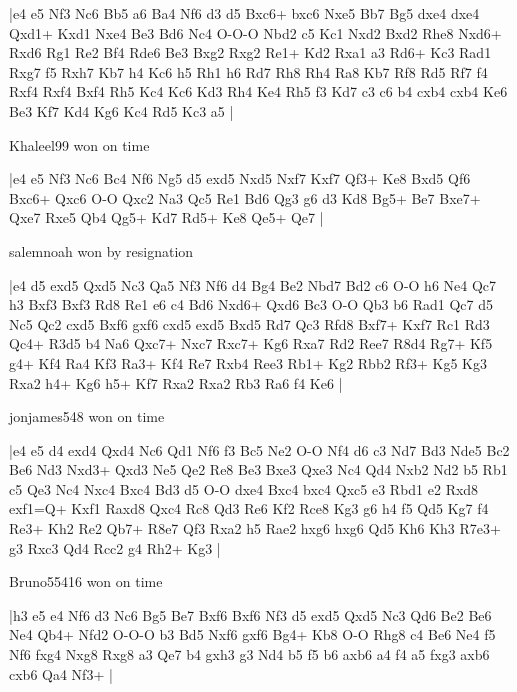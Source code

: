 \makegametitle
|e4 e5 Nf3 Nc6 Bb5 a6 Ba4 Nf6 d3 d5 Bxc6+ bxc6 Nxe5 Bb7 Bg5 dxe4 dxe4 Qxd1+ Kxd1 Nxe4 Be3 Bd6 Nc4 O-O-O Nbd2 c5 Kc1 Nxd2 Bxd2 Rhe8 Nxd6+ Rxd6 Rg1 Re2 Bf4 Rde6 Be3 Bxg2 Rxg2 Re1+ Kd2 Rxa1 a3 Rd6+ Kc3 Rad1 Rxg7 f5 Rxh7 Kb7 h4 Kc6 h5 Rh1 h6 Rd7 Rh8 Rh4 Ra8 Kb7 Rf8 Rd5 Rf7 f4 Rxf4 Rxf4 Bxf4 Rh5 Kc4 Kc6 Kd3 Rh4 Ke4 Rh5 f3 Kd7 c3 c6 b4 cxb4 cxb4 Ke6 Be3 Kf7 Kd4 Kg6 Kc4 Rd5 Kc3 a5  |

\showboard

Khaleel99 won on time

\makegametitle
|e4 e5 Nf3 Nc6 Bc4 Nf6 Ng5 d5 exd5 Nxd5 Nxf7 Kxf7 Qf3+ Ke8 Bxd5 Qf6 Bxc6+ Qxc6 O-O Qxc2 Na3 Qc5 Re1 Bd6 Qg3 g6 d3 Kd8 Bg5+ Be7 Bxe7+ Qxe7 Rxe5 Qb4 Qg5+ Kd7 Rd5+ Ke8 Qe5+ Qe7  |

\showboard

salemnoah won by resignation

\makegametitle
|e4 d5 exd5 Qxd5 Nc3 Qa5 Nf3 Nf6 d4 Bg4 Be2 Nbd7 Bd2 c6 O-O h6 Ne4 Qc7 h3 Bxf3 Bxf3 Rd8 Re1 e6 c4 Bd6 Nxd6+ Qxd6 Bc3 O-O Qb3 b6 Rad1 Qc7 d5 Nc5 Qc2 cxd5 Bxf6 gxf6 cxd5 exd5 Bxd5 Rd7 Qc3 Rfd8 Bxf7+ Kxf7 Rc1 Rd3 Qc4+ R3d5 b4 Na6 Qxc7+ Nxc7 Rxc7+ Kg6 Rxa7 Rd2 Ree7 R8d4 Rg7+ Kf5 g4+ Kf4 Ra4 Kf3 Ra3+ Kf4 Re7 Rxb4 Ree3 Rb1+ Kg2 Rbb2 Rf3+ Kg5 Kg3 Rxa2 h4+ Kg6 h5+ Kf7 Rxa2 Rxa2 Rb3 Ra6 f4 Ke6  |

\showboard

jonjames548 won on time

\makegametitle
|e4 e5 d4 exd4 Qxd4 Nc6 Qd1 Nf6 f3 Bc5 Ne2 O-O Nf4 d6 c3 Nd7 Bd3 Nde5 Bc2 Be6 Nd3 Nxd3+ Qxd3 Ne5 Qe2 Re8 Be3 Bxe3 Qxe3 Nc4 Qd4 Nxb2 Nd2 b5 Rb1 c5 Qe3 Nc4 Nxc4 Bxc4 Bd3 d5 O-O dxe4 Bxc4 bxc4 Qxc5 e3 Rbd1 e2 Rxd8 exf1=Q+ Kxf1 Raxd8 Qxc4 Rc8 Qd3 Re6 Kf2 Rce8 Kg3 g6 h4 f5 Qd5 Kg7 f4 Re3+ Kh2 Re2 Qb7+ R8e7 Qf3 Rxa2 h5 Rae2 hxg6 hxg6 Qd5 Kh6 Kh3 R7e3+ g3 Rxc3 Qd4 Rcc2 g4 Rh2+ Kg3  |

\showboard

Bruno55416 won on time

\makegametitle
|h3 e5 e4 Nf6 d3 Nc6 Bg5 Be7 Bxf6 Bxf6 Nf3 d5 exd5 Qxd5 Nc3 Qd6 Be2 Be6 Ne4 Qb4+ Nfd2 O-O-O b3 Bd5 Nxf6 gxf6 Bg4+ Kb8 O-O Rhg8 c4 Be6 Ne4 f5 Nf6 fxg4 Nxg8 Rxg8 a3 Qe7 b4 gxh3 g3 Nd4 b5 f5 b6 axb6 a4 f4 a5 fxg3 axb6 cxb6 Qa4 Nf3+  |

